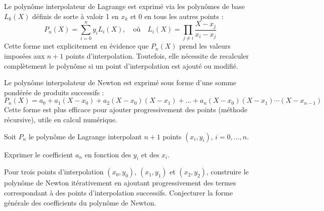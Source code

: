 \documentclass[10pt,a4paper]{article}
\begin{document}
Le polynôme interpolateur de Lagrange est exprimé via les polynômes de base \( L_k(X) \) définis de
sorte à valoir 1 en \( x_k \) et 0 en tous les autres points :
\[
P_n(X) = \sum_{i=0}^{n} y_i L_i(X), \quad \text{où} \quad L_i(X) = \prod_{j \neq i} \frac{X - x_j}{x_i - x_j}
\]
Cette forme met explicitement en évidence que \( P_n(X) \) prend les valeurs imposées aux \( n+1 \)
points d'interpolation. Toutefois, elle nécessite de recalculer complètement le polynôme si un point
d'interpolation est ajouté ou modifié.

Le polynôme interpolateur de Newton est exprimé sous forme d'une somme pondérée de produits
successifs :
\[
P_n(X) = a_0 + a_1 (X - x_0) + a_2 (X - x_0)(X - x_1) + \dots + a_n (X - x_0)(X - x_1) \cdots (X - x_{n-1})
\]
Cette forme est plus efficace pour ajouter progressivement des points (méthode récursive), utile en
calcul numérique.

Soit $P_n$ le polynôme de Lagrange interpolant $n+1$ points $(x_i, y_i)$, $i = 0, \ldots, n$.

\q Exprimer le coefficient $a_n$ en fonction des $y_i$ et des $x_i$.

\q Pour trois points d'interpolation $(x_0, y_0)$, $(x_1, y_1)$ et $(x_2, y_2)$, construire le
polynôme de Newton itérativement en ajoutant progressivement des termes correspondant à des points
d'interpolation successifs. Conjecturer la forme générale des coefficients du polynôme de Newton.
\end{document}
